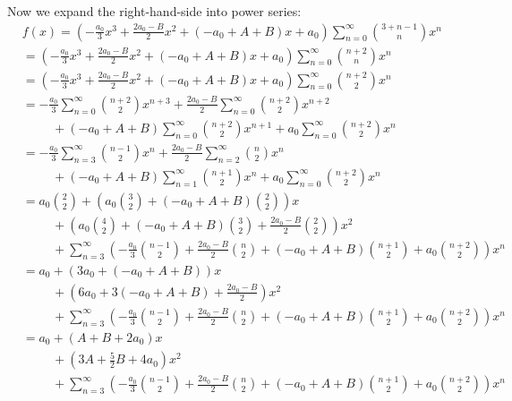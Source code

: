 Now we expand the right-hand-side into power series:
\begin{align*}
&f(x) =
\left(
    -\frac{a_0}{3}x^3 + \frac{2 a_0 - B}{2}x^2 + (-a_0 + A + B )x + a_0
\right)
\sum_{n=0}^\infty \binom{3 + n - 1}{n} x^n
\\
&=
\left(
    -\frac{a_0}{3}x^3 + \frac{2 a_0 - B}{2}x^2 + (-a_0 + A + B )x + a_0
\right)
\sum_{n=0}^\infty \binom{n + 2}{n} x^n
\\
&=
\left(
    -\frac{a_0}{3}x^3 + \frac{2 a_0 - B}{2}x^2 + (-a_0 + A + B )x + a_0
\right)
\sum_{n=0}^\infty \binom{n + 2}{2} x^n
\\
&=
  -\frac{a_0}{3} \sum_{n=0}^\infty \binom{n + 2}{2} x^{n+3} 
 + \frac{2 a_0 - B}{2} \sum_{n=0}^\infty \binom{n + 2}{2} x^{n+2} \\
&\hspace{1cm} + (-a_0 + A + B ) \sum_{n=0}^\infty \binom{n + 2}{2} x^{n+1}
+ a_0 \sum_{n=0}^\infty \binom{n + 2}{2} x^{n} 
\\
&=
  -\frac{a_0}{3} \sum_{n=3}^\infty \binom{n - 1}{2} x^{n} 
  + \frac{2 a_0 - B}{2} \sum_{n=2}^\infty \binom{n}{2} x^{n} \\
&\hspace{1cm} + (-a_0 + A + B ) \sum_{n=1}^\infty \binom{n + 1}{2} x^{n}
+ a_0 \sum_{n=0}^\infty \binom{n + 2}{2} x^{n} 
\\
&= a_0 \binom{2}{2}
+ \left( a_0 \binom{3}{2} + (-a_0 + A + B) \binom{2}{2}\right) x
\\
&\hspace{1cm} + \left( a_0 \binom{4}{2} + (-a_0 + A + B) \binom{3}{2} +
  \frac{2a_0 - B}{2}\binom{2}{2}
  \right) x^2
  \\
&\hspace{1cm} + \sum_{n=3}^\infty
   \left(
     -\frac{a_0}{3}\binom{n-1}{2}
     + \frac{2a_0 - B}{2} \binom{n}{2}
     + (-a_0 + A + B)\binom{n+1}{2}
     + a_0 \binom{n+2}{2}
   \right) x^n
\\
&= a_0
+ \left( 3 a_0 + (-a_0 + A + B) \right) x
\\
&\hspace{1cm} + \left( 6 a_0 + 3(-a_0 + A + B)  +
  \frac{2a_0 - B}{2}
  \right) x^2
  \\
&\hspace{1cm} + \sum_{n=3}^\infty
   \left(
     -\frac{a_0}{3}\binom{n-1}{2}
     + \frac{2a_0 - B}{2} \binom{n}{2}
     + (-a_0 + A + B)\binom{n+1}{2}
     + a_0 \binom{n+2}{2}
   \right) x^n
\\
&= a_0
+ \left( A + B + 2a_0 \right) x
\\
&\hspace{1cm} + \left( 3A + \frac{5}{2}B + 4a_0 \right) x^2 \\
&\hspace{1cm} + \sum_{n=3}^\infty
   \left(
     -\frac{a_0}{3}\binom{n-1}{2}
     + \frac{2a_0 - B}{2} \binom{n}{2}
     + (-a_0 + A + B)\binom{n+1}{2}
     + a_0 \binom{n+2}{2}
   \right) x^n
\end{align*}

